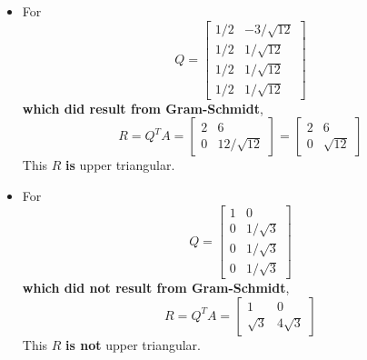 \documentclass[11pt]{article}
\begin{document}
\begin{prob}
\begin{subprob}
\begin{solution}
\begin{itemize}
    \item For
    \[
    Q =
    \begin{bmatrix}
    1/2 & -3/\sqrt{12} \\
    1/2 & 1/\sqrt{12} \\
    1/2 & 1/\sqrt{12} \\
    1/2 & 1/\sqrt{12}
    \end{bmatrix}
    \]
    \textbf{which did result from Gram-Schmidt},
    \[
    R = Q^TA
    =
    \begin{bmatrix}
    2 & 6 \\
    0 & 12/\sqrt{12}
    \end{bmatrix}
    =
    \begin{bmatrix}
    2 & 6 \\
    0 & \sqrt{12}
    \end{bmatrix}
    \]
    This $R$ \textbf{is} upper triangular.

    \item For
    \[
    Q =
    \begin{bmatrix}
    1 & 0 \\
    0 & 1/\sqrt{3} \\
    0 & 1/\sqrt{3} \\
    0 & 1/\sqrt{3}
    \end{bmatrix}
    \]
    \textbf{which did not result from Gram-Schmidt},
    \[
    R = Q^TA
    =
    \begin{bmatrix}
    1 & 0 \\
    \sqrt{3} & 4\sqrt{3}
    \end{bmatrix}
    \]
    This $R$ \textbf{is not} upper triangular.
\end{itemize}
\end{solution}\end{subprob}

\end{prob}

\newpage
\end{document}
